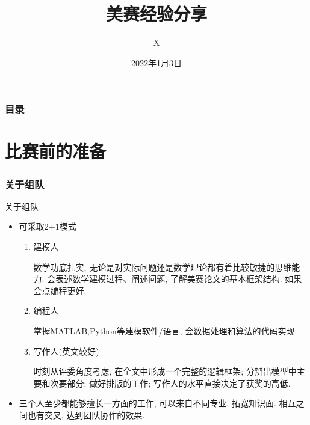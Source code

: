 \documentclass{ctexbeamer}
\title[美赛经验分享]{美赛经验分享}
\author[X]{X}
\institute[DLUT]{%
	大连理工大学
}
\date{2022年1月3日}
\begin{document}
\maketitle

\begin{frame}
	\frametitle{\textbf{目录}}
	\tableofcontents
\end{frame}


\section{比赛前的准备} %
\label{sec:比赛准备}

\subsubsection{关于组队} %
\label{ssub:关于组队}

\begin{frame}{关于组队}
	\begin{itemize}
		\item 可采取2+1模式
		      \begin{enumerate}
			      \item 建模人

			            \parbox[t]{.75\textwidth}{数学功底扎实, 无论是对实际问题还是数学理论都有着比较敏捷的思维能力. 会表述数学建模过程、阐述问题, 了解美赛论文的基本框架结构. 如果会点编程更好. }
			            \vspace*{7pt}

			      \item 编程人

			            \parbox[t]{.75\textwidth}{掌握MATLAB,Python等建模软件/语言, 会数据处理和算法的代码实现. }
			            \vspace*{7pt}

			      \item 写作人(英文较好)

			            \parbox[t]{.75\textwidth}{时刻从评委角度考虑, 在全文中形成一个完整的逻辑框架; 分辨出模型中主要和次要部分; 做好排版的工作; 写作人的水平直接决定了获奖的高低. }
		      \end{enumerate}
		      \vspace{5pt}
		\item \parbox[t]{.85\textwidth}{三个人至少都能够擅长一方面的工作, 可以来自不同专业, 拓宽知识面. 相互之间也有交叉, 达到团队协作的效果. }
	\end{itemize}
\end{frame}
\end{document}

